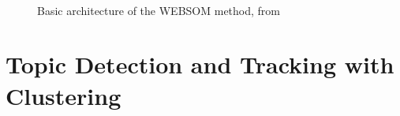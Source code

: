 \begin{figure}[htpb]
  \\
  \caption{Basic architecture of the WEBSOM method, from~\cite{honkelawebsom}}
  \label{fig:websom}
\end{figure}
 
\section{Topic Detection and Tracking with Clustering} 
\label{sec:topic_detection_on_twitter}

